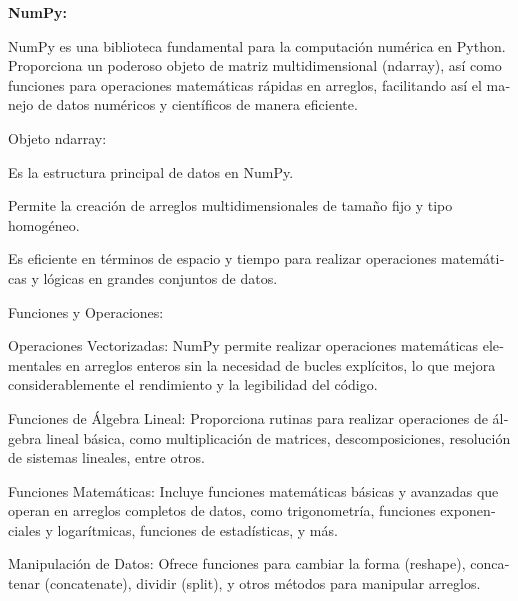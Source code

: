 \documentclass[letterpaper]{article}
\begin{document}
\bigskip


\bigskip


\bigskip


{
\bigskip
\bigskip
\bigskip
\foreignlanguage{spanish}{\textbf{NumPy:}}}

{
\foreignlanguage{spanish}{NumPy es una biblioteca fundamental para la computación numérica en Python. Proporciona un
poderoso objeto de matriz multidimensional (ndarray), así como funciones para operaciones matemáticas rápidas en
arreglos, facilitando así el manejo de datos numéricos y científicos de manera eficiente.}}

{
\foreignlanguage{spanish}{Objeto ndarray:}}

{
\foreignlanguage{spanish}{Es la estructura principal de datos en NumPy.}}

{
\foreignlanguage{spanish}{Permite la creación de arreglos multidimensionales de tamaño fijo y tipo homogéneo.}}

{
\foreignlanguage{spanish}{Es eficiente en términos de espacio y tiempo para realizar operaciones matemáticas y lógicas
en grandes conjuntos de datos.}}

{
\foreignlanguage{spanish}{Funciones y Operaciones:}}

{
\foreignlanguage{spanish}{Operaciones Vectorizadas: NumPy permite realizar operaciones matemáticas elementales en
arreglos enteros sin la necesidad de bucles explícitos, lo que mejora considerablemente el rendimiento y la legibilidad
del código.}}

{
\foreignlanguage{spanish}{Funciones de Álgebra Lineal: Proporciona rutinas para realizar operaciones de álgebra lineal
básica, como multiplicación de matrices, descomposiciones, resolución de sistemas lineales, entre otros.}}

{
\foreignlanguage{spanish}{Funciones Matemáticas: Incluye funciones matemáticas básicas y avanzadas que operan en
arreglos completos de datos, como trigonometría, funciones exponenciales y logarítmicas, funciones de estadísticas, y
más.}}

{
\foreignlanguage{spanish}{Manipulación de Datos: Ofrece funciones para cambiar la forma (reshape), concatenar
(concatenate), dividir (split), y otros métodos para manipular arreglos.}}
\end{document}
